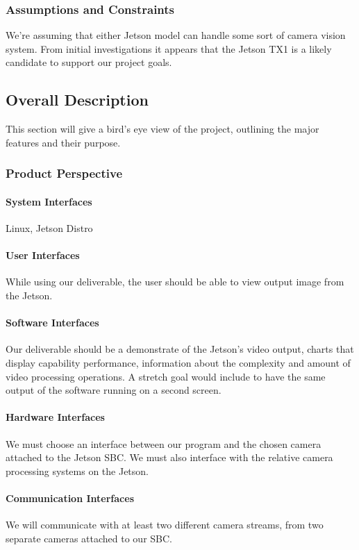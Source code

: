 \subsubsection{Assumptions and Constraints}
We're assuming that either Jetson model can handle some sort of camera vision system. From initial investigations it appears that the Jetson TX1 is a likely candidate to support our project goals.

\subsection{Overall Description}
This section will give a bird's eye view of the project, outlining the major features and their purpose.\\
\subsubsection{Product Perspective}
  \paragraph{System Interfaces}
  Linux, Jetson Distro
  \paragraph{User Interfaces}
  While using our deliverable, the user should be able to view output image from the Jetson.
  \paragraph{Software Interfaces}
  Our deliverable should be a demonstrate of the Jetson's video output, charts that display capability performance, information about the complexity and amount of video processing operations. A stretch goal would include to have the same output of the software running on a second screen.
  \paragraph{Hardware Interfaces}
  We must choose an interface between our program and the chosen camera attached to the Jetson SBC. We must also interface with the relative camera processing systems on the Jetson.
  \paragraph{Communication Interfaces}
  We will communicate with at least two different camera streams, from two separate cameras attached to our SBC.\\
  
